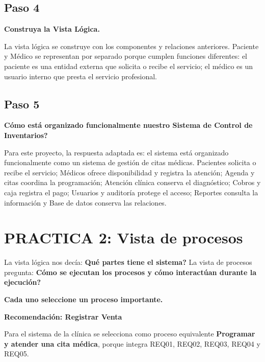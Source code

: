 \subsection*{Paso 4}
\textbf{Construya la Vista Lógica.}

La vista lógica se construye con los componentes y relaciones anteriores. Paciente y Médico se representan por separado porque cumplen funciones diferentes: el paciente es una entidad externa que solicita o recibe el servicio; el médico es un usuario interno que presta el servicio profesional.

\subsection*{Paso 5}
\textbf{\textquestiondown{}Cómo está organizado funcionalmente nuestro Sistema de Control de Inventarios?}

Para este proyecto, la respuesta adaptada es: el sistema está organizado funcionalmente como un sistema de gestión de citas médicas. Pacientes solicita o recibe el servicio; Médicos ofrece disponibilidad y registra la atención; Agenda y citas coordina la programación; Atención clínica conserva el diagnóstico; Cobros y caja registra el pago; Usuarios y auditoría protege el acceso; Reportes consulta la información y Base de datos conserva las relaciones.

\section{PRACTICA 2: Vista de procesos}

La vista lógica nos decía: \textbf{\textquestiondown{}Qué partes tiene el sistema?} La vista de procesos pregunta: \textbf{\textquestiondown{}Cómo se ejecutan los procesos y cómo interactúan durante la ejecución?}

\textbf{Cada uno seleccione un proceso importante.}

\textbf{Recomendación: Registrar Venta}

Para el sistema de la clínica se selecciona como proceso equivalente \textbf{Programar y atender una cita médica}, porque integra REQ01, REQ02, REQ03, REQ04 y REQ05.

